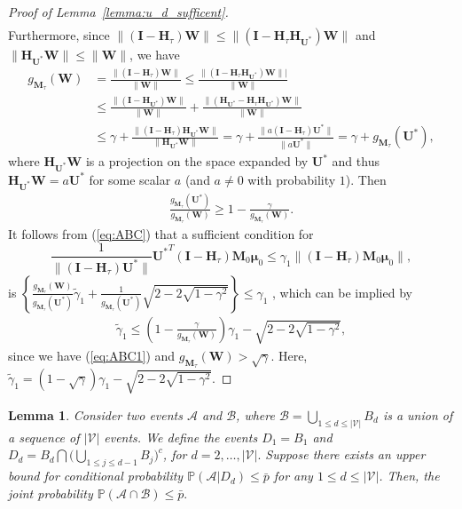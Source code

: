 \documentclass[12pt]{article}
\theoremstyle{shortspace}
\newtheorem{lemma}{Lemma}
\def\*#1{\bm{#1}}
\def\P{\mathbb P}
\begin{document}
\begin{proof}[Proof of Lemma~\ref{lemma:u_d_sufficent}]
\begin{align}
\end{align}
Furthermore, 
since $\|(\*I - \*H_\tau)\*W\|  \leq \|(\*I - \*H_\tau   \*H_{\*U^*}){\*W}\|$ and $\|\*H_{\*U^*}{\*W}\| \leq \|\*W\|$,
we have
\begin{align*}
    g_{\*M_\tau}({\*W})  & = \frac{\|(\*I - \*H_\tau){\*W}\|}{\|\*W\|} \leq \frac{\|(\*I - \*H_\tau   \*H_{\*U^*}){\*W}\||}{\|\*W\|}   
    \\ & \leq \frac{\|(\*I -  \*H_{\*U^*}){\*W}\|}{\|{\*W}\|} + \frac{\|(  \*H_{\*U^*}-\*H_{\tau}   \*H_{\*U^*}){\*W}\|}{\|{\*W}\|} \\
    & \leq \gamma + \frac{\|(\*I - \*H_\tau)  \*H_{\*U^*}{\*W}\|}{\|  \*H_{\*U^*}{\*W}\|} { =}  \gamma +  \frac{\|a(\*I - \*H_\tau)  {\*U^*}\|}{\|  a{\*U^*}\|} = \gamma + g_{\*M_\tau}(\*U^*),
\end{align*}
where $\*H_{\*U^*}\*W$ is a projection on the space expanded by $\*U^*$ and thus $\*H_{\*U^*}\*W = a \*U^*$ for some scalar $a$ (and $a \not = 0$ with probability $1$). 
Then 
\begin{align}
\label{eq:ABC1}
\frac{g_{\*M_\tau}({\*U^*})}{g_{\*M_\tau}(\*W)}\geq 1 - \frac{\gamma}{g_{\*M_\tau}(\*W)}.     
\end{align}
It follows from (\ref{eq:ABC}) that a sufficient condition for $$\frac{1}{\|(\*I - \*H_\tau){\*U^*}\|}{\*U^*}^T(\*I - \*H_\tau)\*M_0\*\mu_0 \leq \gamma_1\|(\*I - \*H_\tau)\*M_0\*\mu_0\|,$$ is 
$\left\{\frac{g_{\*M_\tau}(\*W)}{g_{\*M_\tau}({\*U^*})} \widetilde\gamma_1
    + \frac{1}{g_{\*M_\tau}({\*U^*})} \sqrt{2-2\sqrt{1-\gamma^2}}\right\} \leq \gamma_1$
, which can be implied by 
\begin{align*}
\widetilde\gamma_1\leq \left(1 - \frac{\gamma}{g_{\*M_\tau}(\*W)}\right) \gamma_1 - \sqrt{2-2\sqrt{1-\gamma^2}},   
\end{align*}
since we have 
(\ref{eq:ABC1}) and $g_{\*M_\tau}(\*W)  > \sqrt{\gamma}.$ Here, 
$\widetilde\gamma_1=(1-\sqrt{\gamma})\gamma_1 - \sqrt{2-2\sqrt{1-\gamma^2}}$. 

\end{proof}



\begin{lemma}
\label{lem: upper_coniditonal}
    Consider two events $\mathcal A$ and $\mathcal B$, where $\mathcal B = \bigcup_{1 \leq d \leq |{\mathcal V}|} B_d$ is a union of a sequence of $|{\mathcal V}|$ events. 
    We define the events $D_1 = B_1$ and $D_d = B_d \bigcap\big(\bigcup_{1\leq j \leq d-1} B_j\big)^c
    $, for $d = 2, \ldots, |{\mathcal V}|.$
    Suppose there exists an upper bound for conditional probability $\P(\mathcal A | D_d) \leq \bar p$ for any $1 \leq d \leq |{\mathcal V}|$. Then, the joint probability $\P(\mathcal A \cap \mathcal B) \leq \bar p.$ 
\end{lemma}
\end{document}
